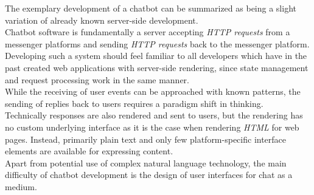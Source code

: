 The exemplary development of a chatbot can be summarized as being a slight variation of already known server-side development.
\\
Chatbot software is fundamentally a server accepting \emph{HTTP requests} from a messenger platforms and sending \emph{HTTP requests} back to the messenger platform.
\\
Developing such a system should feel familiar to all developers which have in the past created web applications with server-side rendering,
since state management and request processing work in the same manner.
\\
While the receiving of user events can be approached with known patterns, the sending of replies back to users requires a paradigm shift in thinking.
\\
Technically responses are also rendered and sent to users,
but the rendering has no custom underlying interface as it is the case when rendering \emph{HTML} for web pages.
Instead, primarily plain text and only few platform-specific interface elements are available for expressing content.
\\

Apart from potential use of complex natural language technology,
the main difficulty of chatbot development is the design of user interfaces for chat as a medium.
